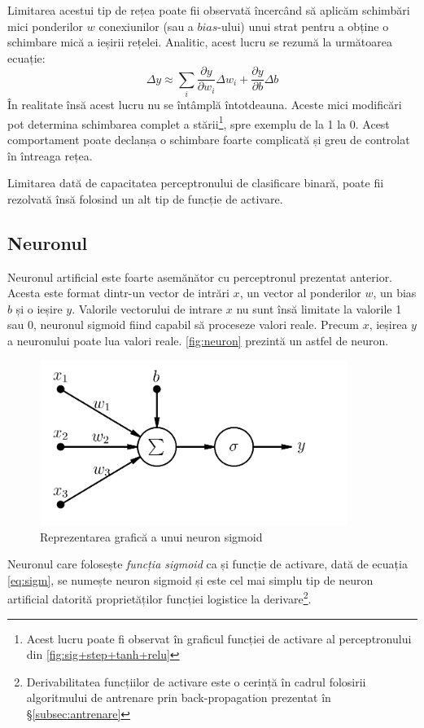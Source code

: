 Limitarea acestui tip de rețea poate fii observată încercând să aplicăm schimbări mici ponderilor $w$ conexiunilor (sau a $bias$-ului) unui strat pentru a obține o schimbare mică a ieșirii rețelei. Analitic, acest lucru se rezumă la următoarea ecuație:
\begin{equation}
\Delta y\approx\sum_i\frac{\partial y}{\partial w_i}\Delta w_i + \frac{\partial y}{\partial b}\Delta b
\end{equation}
În realitate însă acest lucru nu se întâmplă întotdeauna. Aceste mici modificări pot determina schimbarea complet a stării\footnote{Acest lucru poate fi observat în graficul funcției de activare al perceptronului din \autoref{fig:sig+step+tanh+relu}}, spre exemplu de la 1 la 0. Acest comportament poate declanșa o schimbare foarte complicată și greu de controlat în întreaga rețea.

Limitarea dată de capacitatea perceptronului de clasificare binară, poate fii rezolvată însă folosind un alt tip de funcție de activare. 

\subsection{Neuronul}\label{subsec:neuronul}
Neuronul artificial este foarte asemănător cu perceptronul prezentat anterior. Acesta este format dintr-un vector de intrări $x$, un vector al ponderilor $w$, un bias $b$ și o ieșire $y$. Valorile vectorului de intrare $x$ nu sunt însă limitate la valorile 1 sau 0, neuronul sigmoid fiind capabil să proceseze valori reale. Precum $x$, ieșirea $y$ a neuronului poate lua valori reale. \autoref{fig:neuron} prezintă un astfel de neuron.
\begin{figure}[ht]
\centering
\includegraphics[width=10cm,keepaspectratio]{fig/cap2/artificial-neuron.png}
\caption{Reprezentarea grafică a unui neuron sigmoid}\label{fig:neuron}
\end{figure}

Neuronul care folosește \textit{funcția sigmoid} ca și funcție de activare, dată de ecuația \eqref{eq:sigm}, se numește neuron sigmoid și este cel mai simplu tip de neuron artificial datorită proprietăților funcției logistice la derivare\footnote{Derivabilitatea funcțiilor de activare este o cerință în cadrul folosirii algoritmului de antrenare prin back-propagation prezentat în \S\ref{subsec:antrenare}}.

